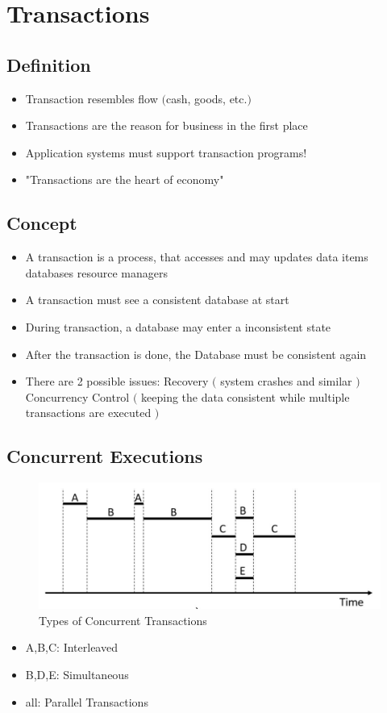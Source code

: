 \chapter{Transactions}
	\section{Definition}
		\begin{itemize}
			\item Transaction resembles flow $($cash, goods, etc.$)$
			\item Transactions are the reason for business in the first place
			\item Application systems must support transaction programs!
			\item \color{red}"Transactions are the heart of economy"\color{black}
		\end{itemize}
			
	
	\section{Concept}
		\begin{itemize}
			\item A transaction is a process, that accesses and may updates data items
				\subitem databases 
				\subitem resource managers
			\item A transaction must see a consistent database at start
			\item During transaction, a database may enter a inconsistent state
			\item After the transaction is done, the Database must be consistent again
			\item There are 2 possible issues:
			\subitem Recovery $($ system crashes and similar $)$ 
			\subitem Concurrency Control $($ keeping the data consistent while multiple transactions are executed $)$
		\end{itemize}
	
	\section{Concurrent Executions}
		\begin{figure}[h!]
			\includegraphics[scale=0.5]{res/Concurrent-Transactions.jpg}
			\caption{Types of Concurrent Transactions}
		\end{figure}
		\begin{itemize}
			\item A,B,C: Interleaved
			\item B,D,E: Simultaneous
			\item all: Parallel Transactions			
		\end{itemize}
	
